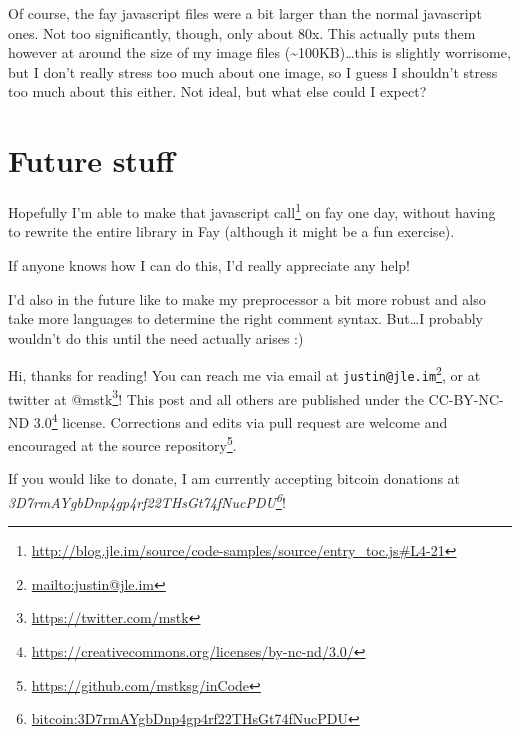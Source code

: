 \documentclass[]{article}
\renewcommand{\href}[2]{#2\footnote{\url{#1}}}
\begin{document}
Of course, the fay javascript files were a bit larger than the normal javascript
ones. Not too significantly, though, only about 80x. This actually puts them
however at around the size of my image files
(\textasciitilde{}100KB)\ldots{}this is slightly worrisome, but I don't really
stress too much about one image, so I guess I shouldn't stress too much about
this either. Not ideal, but what else could I expect?

\hypertarget{future-stuff}{%
\section{Future stuff}\label{future-stuff}}

Hopefully I'm able to make
\href{http://blog.jle.im/source/code-samples/source/entry_toc.js\#L4-21}{that
javascript call} on fay one day, without having to rewrite the entire library in
Fay (although it might be a fun exercise).

If anyone knows how I can do this, I'd really appreciate any help!

I'd also in the future like to make my preprocessor a bit more robust and also
take more languages to determine the right comment syntax. But\ldots{}I probably
wouldn't do this until the need actually arises :)

Hi, thanks for reading! You can reach me via email at
\href{mailto:justin@jle.im}{\nolinkurl{justin@jle.im}}, or at twitter at
\href{https://twitter.com/mstk}{@mstk}! This post and all others are published
under the \href{https://creativecommons.org/licenses/by-nc-nd/3.0/}{CC-BY-NC-ND
3.0} license. Corrections and edits via pull request are welcome and encouraged
at \href{https://github.com/mstksg/inCode}{the source repository}.

If you would like to donate, I am currently accepting bitcoin donations at
\emph{\href{bitcoin:3D7rmAYgbDnp4gp4rf22THsGt74fNucPDU}{3D7rmAYgbDnp4gp4rf22THsGt74fNucPDU}}!
\end{document}
